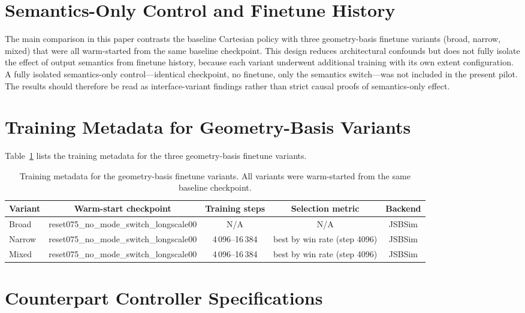 \documentclass[drones,article,submit,pdftex,moreauthors]{Definitions/mdpi}
\begin{document}
\appendix

\section{Semantics-Only Control and Finetune History}

The main comparison in this paper contrasts the baseline Cartesian policy with three geometry-basis finetune variants (broad, narrow, mixed) that were all warm-started from the same baseline checkpoint. This design reduces architectural confounds but does not fully isolate the effect of output semantics from finetune history, because each variant underwent additional training with its own extent configuration. A fully isolated semantics-only control---identical checkpoint, no finetune, only the semantics switch---was not included in the present pilot. The results should therefore be read as interface-variant findings rather than strict causal proofs of semantics-only effect.

\section{Training Metadata for Geometry-Basis Variants}

Table~\ref{tab:training_metadata} lists the training metadata for the three geometry-basis finetune variants.
\begin{table}[H]
\centering
\caption{Training metadata for the geometry-basis finetune variants. All variants were warm-started from the same baseline checkpoint.}
\label{tab:training_metadata}
\begin{tabular}{@{}lcccc@{}}
\toprule
Variant & Warm-start checkpoint & Training steps & Selection metric & Backend \\
\midrule
Broad & reset075\_no\_mode\_switch\_longscale00 & N/A & N/A & JSBSim \\
Narrow & reset075\_no\_mode\_switch\_longscale00 & 4\,096--16\,384 & best by win rate (step 4096) & JSBSim \\
Mixed & reset075\_no\_mode\_switch\_longscale00 & 4\,096--16\,384 & best by win rate (step 4096) & JSBSim \\
\bottomrule
\end{tabular}
\end{table}


\section{Counterpart Controller Specifications}
\end{document}

